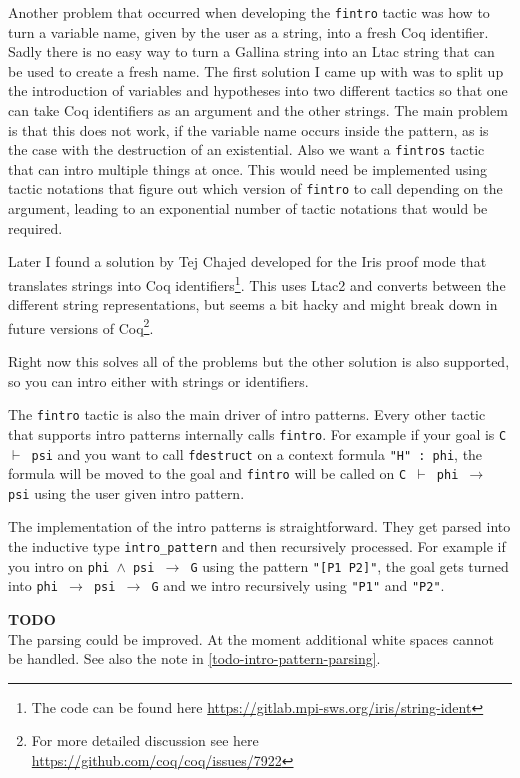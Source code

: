 \documentclass[12pt, a4paper]{article}
\newcommand{\coq}[1]{\texttt{#1}}
\newcommand{\improve}[1]{
	\vspace{3pt}
	\begin{boximprove}
		\parbox{\textwidth}{\textcolor{colorimprove}{\textbf{TODO}\\#1}}
	\end{boximprove}}
\begin{document}
\medskip\noindent
Another problem that occurred when developing the \texttt{fintro} tactic was how to turn a variable name, given by the user as a string, into a fresh Coq identifier.
Sadly there is no easy way to turn a Gallina string into an Ltac string that can be used to create a fresh name.
The first solution I came up with was to split up the introduction of variables and hypotheses into two different tactics  so that one can take Coq identifiers as an argument and the other strings.
The main problem is that this does not work, if the variable name occurs inside the pattern, as is the case with the destruction of an existential.
Also we want a \texttt{fintros} tactic that can intro multiple things at once.
This would need be implemented using tactic notations that figure out which version of \texttt{fintro} to call depending on the argument, leading to an exponential number of tactic notations that would be required.

Later I found a solution by Tej Chajed developed for the Iris proof mode that translates strings into Coq identifiers\footnote{The code can be found here \url{https://gitlab.mpi-sws.org/iris/string-ident}}.
This uses Ltac2 and converts between the different string representations, but seems a bit hacky and might break down in future versions of Coq\footnote{For more detailed discussion see here \url{https://github.com/coq/coq/issues/7922}}.

Right now this solves all of the problems but the other solution is also supported, so you can intro either with strings or identifiers.

\medskip\noindent
The \texttt{fintro} tactic is also the main driver of intro patterns.
Every other tactic that supports intro patterns internally calls \texttt{fintro}.
For example if your goal is \texttt{C $\vdash$ psi} and you want to call \texttt{fdestruct} on a context formula \coq{"H" : phi}, the formula will be moved to the goal and \texttt{fintro} will be called on \texttt{C $\vdash$ phi $\to$ psi} using the user given intro pattern.

The implementation of the intro patterns is straightforward.
They get parsed into the inductive type \texttt{intro\_pattern} and then recursively processed.
For example if you intro on \texttt{phi $\land$ psi $\to$ G} using the pattern \coq{"[P1 P2]"}, the goal gets turned into \texttt{phi $\to$ psi $\to$ G} and we intro recursively using \coq{"P1"} and \coq{"P2"}.

\improve{The parsing could be improved. At the moment additional white spaces cannot be handled. See also the note in \ref{todo-intro-pattern-parsing}.}
\end{document}
